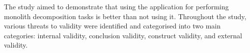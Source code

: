 The study aimed to demonstrate that using the application for performing
monolith decomposition tasks is better than not using it. Throughout the study,
various threats to validity were identified and categorised into two main
categories: internal validity, conclusion validity, construct validity, and
external validity.
